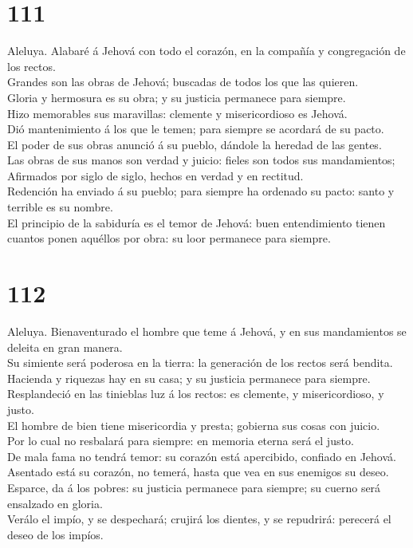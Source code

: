 \hypertarget{section-110}{%
\section{111}\label{section-110}}

 Aleluya. Alabaré á Jehová con todo el corazón, en la
compañía y congregación de los rectos.\\
 Grandes son las obras de Jehová; buscadas de todos los que
las quieren.\\
 Gloria y hermosura es su obra; y su justicia permanece para
siempre.\\
 Hizo memorables sus maravillas: clemente y misericordioso
es Jehová.\\
 Dió mantenimiento á los que le temen; para siempre se
acordará de su pacto.\\
 El poder de sus obras anunció á su pueblo, dándole la
heredad de las gentes.\\
 Las obras de sus manos son verdad y juicio: fieles son
todos sus mandamientos;\\
 Afirmados por siglo de siglo, hechos en verdad y en
rectitud.\\
 Redención ha enviado á su pueblo; para siempre ha ordenado
su pacto: santo y terrible es su nombre.\\
 El principio de la sabiduría es el temor de Jehová: buen
entendimiento tienen cuantos ponen aquéllos por obra: su loor permanece
para siempre.

\hypertarget{section-111}{%
\section{112}\label{section-111}}

 Aleluya. Bienaventurado el hombre que teme á Jehová, y en
sus mandamientos se deleita en gran manera.\\
 Su simiente será poderosa en la tierra: la generación de
los rectos será bendita.\\
 Hacienda y riquezas hay en su casa; y su justicia permanece
para siempre.\\
 Resplandeció en las tinieblas luz á los rectos: es
clemente, y misericordioso, y justo.\\
 El hombre de bien tiene misericordia y presta; gobierna sus
cosas con juicio.\\
 Por lo cual no resbalará para siempre: en memoria eterna
será el justo.\\
 De mala fama no tendrá temor: su corazón está apercibido,
confiado en Jehová.\\
 Asentado está su corazón, no temerá, hasta que vea en sus
enemigos su deseo.\\
 Esparce, da á los pobres: su justicia permanece para
siempre; su cuerno será ensalzado en gloria.\\
 Verálo el impío, y se despechará; crujirá los dientes, y
se repudrirá: perecerá el deseo de los impíos.

